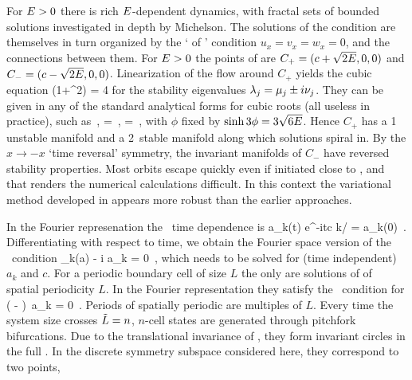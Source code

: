 For $E>0$ there is rich
$E$-dependent dynamics, with
fractal sets of bounded solutions investigated in
depth by Michelson.
The solutions of the {\eqv}  condition
 are themselves in turn organized by the
`{\eqva}  of {\eqva}'  condition
\( u_x= v_x= w_x= 0 \), and
the connections between them.
    For $E>0$ the {\reqva}  points of  are
$C_{+}=(c+\sqrt{2E},0,0)$ and $C_{-}=(c-\sqrt{2E},0,0)$.
Linearization of the flow around $C_{+}$ yields the cubic equation
  \beq
\eigExp(1+\eigExp^2) = 4 \expctE
for the
stability eigenvalues
$\eigExp[j] = \eigRe[j] \pm i \eigIm[j]$.
They can
be given in any of the standard analytical forms for cubic
roots  (all useless in practice), such as
    \,,\qquad
\eigRe=\sinh \phi
\,,\qquad
\eigIm=\cosh \phi \, ,
with $\phi$ fixed by $\sinh 3\phi=3\sqrt{6\expctE}$.
Hence $C_{+}$ has a {1\dmn}
unstable manifold and a 2\dmn\ stable manifold
along which solutions spiral in.
By the $x \to -x$ `time reversal' symmetry, the
invariant manifolds of $C_{-}$
have reversed stability properties.
Most orbits escape quickly even if initiated close to \eqva, and that
renders the numerical calculations
difficult.
In this context the variational method
developed in 
appears more robust than
the earlier approaches.


%

In the Fourier represenation the \reqva\ time
dependence is
\beq
 a_k(t) e^{-itc k/\tildeL} = a_k(0)
\,.
Differentiating with respect to time, we obtain
the Fourier space version of the \reqv\ condition
\beq
 \pVeloc_k(a) - i  a_k = 0
\,,
which needs to be solved for (time independent) $a_k$ and $c$.
For a periodic boundary cell of size
$L$ the only {\eqva}  are
solutions of  of spatial periodicity $L$.
In the Fourier representation they satisfy
the \eqv\ condition for 
\beq
\left(  -   \right)\, a_k
  = 0
\,.
\label{eq:stfks}
\eeq
Periods of spatially periodic {\eqva} are multiples of $L$.
Every time the system size crosses  $\tilde{L}=n$,
$n$-cell states
are generated through pitchfork bifurcations.
Due to the translational invariance of {\KSe},
they form invariant circles
in the full \statesp.
In the discrete symmetry subspace considered here, they correspond to two points,

